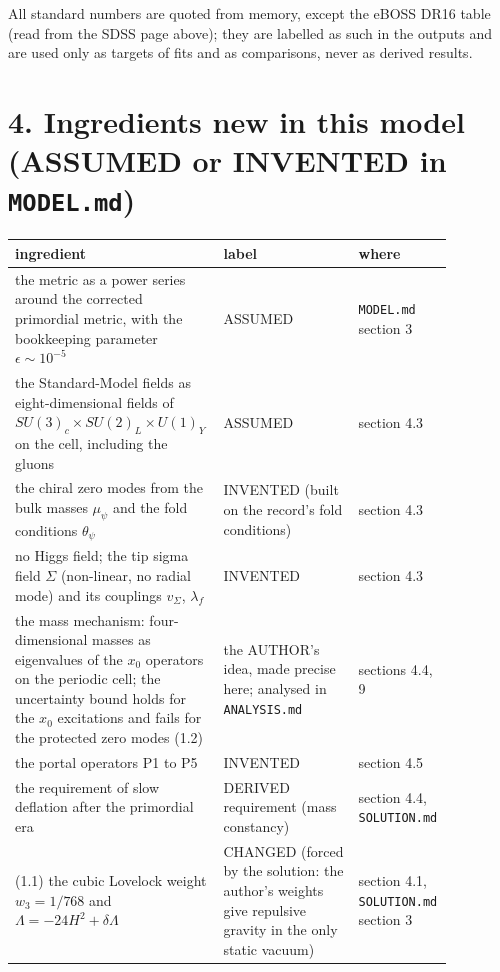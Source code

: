 \documentclass[11pt]{article}
\begin{document}
All standard numbers are quoted from memory, except the eBOSS DR16 table (read from the SDSS page above); they are labelled as such in the outputs and are used only as targets of fits and as comparisons, never as derived results.

\section*{4. Ingredients new in this model (ASSUMED or INVENTED in \texttt{MODEL.\allowbreak{}md})}

\begin{longtable}{>{\raggedright\arraybackslash}p{0.368\linewidth}>{\raggedright\arraybackslash}p{0.307\linewidth}>{\raggedright\arraybackslash}p{0.194\linewidth}}
\toprule
\textbf{ingredient} & \textbf{label} & \textbf{where} \\
\midrule
the metric as a power series around the corrected primordial metric, with the bookkeeping parameter $\epsilon \sim 10^{-5}$ & ASSUMED & \texttt{MODEL.\allowbreak{}md} section 3 \\
the Standard-Model fields as eight-dimensional fields of $SU(3)_c \times SU(2)_L \times U(1)_Y$ on the cell, including the gluons & ASSUMED & section 4.3 \\
the chiral zero modes from the bulk masses $\mu_\psi$ and the fold conditions $\theta_\psi$ & INVENTED (built on the record's fold conditions) & section 4.3 \\
no Higgs field; the tip sigma field $\Sigma$ (non-linear, no radial mode) and its couplings $v_\Sigma$, $\lambda_f$ & INVENTED & section 4.3 \\
the mass mechanism: four-dimensional masses as eigenvalues of the $x_0$ operators on the periodic cell; the uncertainty bound holds for the $x_0$ excitations and fails for the protected zero modes (1.2) & the AUTHOR's idea, made precise here; analysed in \texttt{ANALYSIS.\allowbreak{}md} & sections 4.4, 9 \\
the portal operators P1 to P5 & INVENTED & section 4.5 \\
the requirement of slow deflation after the primordial era & DERIVED requirement (mass constancy) & section 4.4, \texttt{SOLUTION.\allowbreak{}md} \\
{}(1.1) the cubic Lovelock weight $w_3 = 1/768$ and $\Lambda = -24H^2 + \delta\Lambda$ & CHANGED (forced by the solution: the author's weights give repulsive gravity in the only static vacuum) & section 4.1, \texttt{SOLUTION.\allowbreak{}md} section 3 \\

\end{longtable}
\end{document}

